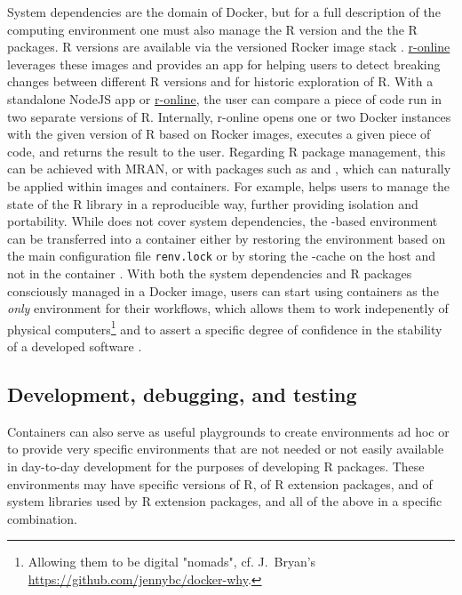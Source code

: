 System dependencies are the domain of Docker, but for a full description
of the computing environment one must also manage the R version and the
the R packages. R versions are available via the versioned Rocker image
stack \citep{RJ-2017-065}.
\href{https://github.com/ColinFay/ronline}{r-online} leverages these
images and provides an app for helping users to detect breaking changes
between different R versions and for historic exploration of R. With a
standalone NodeJS app or
\href{https://srv.colinfay.me/r-online}{r-online}, the user can compare
a piece of code run in two separate versions of R. Internally, r-online
opens one or two Docker instances with the given version of R based on
Rocker images, executes a given piece of code, and returns the result to
the user. Regarding R package management, this can be achieved with
MRAN, or with packages such as 
\citep{cran_checkpoint} and  \citep{renv2019}, which can
naturally be applied within images and containers. For example,
 helps users to manage the state of the R library in a
reproducible way, further providing isolation and portability. While
 does not cover system dependencies, the
-based environment can be transferred into a container
either by restoring the environment based on the main configuration file
\texttt{renv.lock} or by storing the -cache on the host
and not in the container \citep{ushey_using_2019}. With both the system
dependencies and R packages consciously managed in a Docker image, users
can start using containers as the \emph{only} environment for their
workflows, which allows them to work indepenently of physical
computers\footnote{Allowing them to be digital "nomads", cf. J.~Bryan's \href{https://github.com/jennybc/docker-why}{https://github.com/jennybc/docker-why}.}
and to assert a specific degree of confidence in the stability of a
developed software
\citep[cf. \texttt{README.Rmd} in][]{marwick_research_2017}.

\hypertarget{development-debugging-and-testing}{%
\subsection{Development, debugging, and
testing}\label{development-debugging-and-testing}}

\label{development}

Containers can also serve as useful playgrounds to create environments
ad hoc or to provide very specific environments that are not needed or
not easily available in day-to-day development for the purposes of
developing R packages. These environments may have specific versions of
R, of R extension packages, and of system libraries used by R extension
packages, and all of the above in a specific combination.

